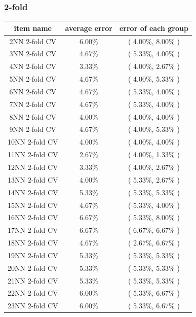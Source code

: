 \documentclass[11pt,a4paper]{article}
\begin{document}
\subsubsection{2-fold}
\begin{center}
    \begin{tabular} {|| c | c | c ||}
        \hline
        item name & average error & error of each group \\ \hline
       2NN 2-fold CV & 6.00\% & ( 4.00\%, 8.00\% ) \\ \hline
        3NN 2-fold CV & 4.67\% & ( 5.33\%, 4.00\% ) \\ \hline
        4NN 2-fold CV & 3.33\% & ( 4.00\%, 2.67\% ) \\ \hline
        5NN 2-fold CV & 4.67\% & ( 4.00\%, 5.33\% ) \\ \hline
        6NN 2-fold CV & 4.67\% & ( 5.33\%, 4.00\% ) \\ \hline
        7NN 2-fold CV & 4.67\% & ( 5.33\%, 4.00\% ) \\ \hline
        8NN 2-fold CV & 4.00\% & ( 4.00\%, 4.00\% ) \\ \hline
        9NN 2-fold CV & 4.67\% & ( 4.00\%, 5.33\% ) \\ \hline
        10NN 2-fold CV & 4.00\% & ( 4.00\%, 4.00\% ) \\ \hline
        11NN 2-fold CV & 2.67\% & ( 4.00\%, 1.33\% ) \\ \hline
        12NN 2-fold CV & 3.33\% & ( 4.00\%, 2.67\% ) \\ \hline
        13NN 2-fold CV & 4.00\% & ( 5.33\%, 2.67\% ) \\ \hline
        14NN 2-fold CV & 5.33\% & ( 5.33\%, 5.33\% ) \\ \hline
        15NN 2-fold CV & 4.67\% & ( 5.33\%, 4.00\% ) \\ \hline
        16NN 2-fold CV & 6.67\% & ( 5.33\%, 8.00\% ) \\ \hline
        17NN 2-fold CV & 6.67\% & ( 6.67\%, 6.67\% ) \\ \hline
        18NN 2-fold CV & 4.67\% & ( 2.67\%, 6.67\% ) \\ \hline
        19NN 2-fold CV & 5.33\% & ( 5.33\%, 5.33\% ) \\ \hline
        20NN 2-fold CV & 5.33\% & ( 5.33\%, 5.33\% ) \\ \hline
        21NN 2-fold CV & 5.33\% & ( 5.33\%, 5.33\% ) \\ \hline
        22NN 2-fold CV & 6.00\% & ( 5.33\%, 6.67\% ) \\ \hline
        23NN 2-fold CV & 6.00\% & ( 5.33\%, 6.67\% ) \\ \hline

\end{tabular}
\end{center}
\end{document}
